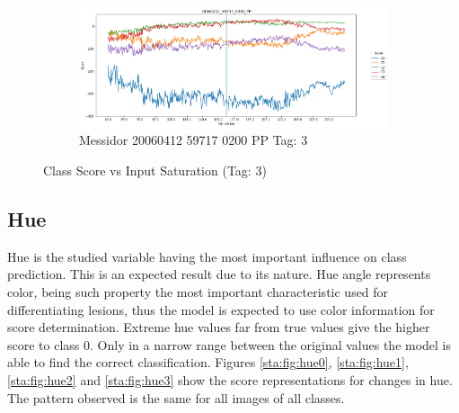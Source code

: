 \begin{figure}[ht!]
\begin{subfigure}[b]{ 0.85\textwidth}
		\centering
		\includegraphics[width=\textwidth]{Figures/chapter_stability/20060412_59717_0200_PP/s/scores.png}
		\caption{Messidor 20060412 59717 0200 PP Tag: 3}		
	\end{subfigure}
	\hfill 
	\caption[Score vs Saturation (Tag: 3)]{Class Score vs Input Saturation (Tag: 3)}  
	\label{sta:fig:sat3} 
\end{figure}

\subsection{Hue}

Hue is the studied variable having the most important influence on class prediction. This is an expected result due to its nature. Hue angle represents color, being such property the most important characteristic used for differentiating lesions, thus the model is expected to use color information for score determination. Extreme hue values far from true values give the higher score to class 0. Only in a narrow range between the original values the model is able to find the correct classification. Figures \ref{sta:fig:hue0}, \ref{sta:fig:hue1}, \ref{sta:fig:hue2} and \ref{sta:fig:hue3} show the score representations for changes in hue. The pattern observed is the same for all images of all classes.

